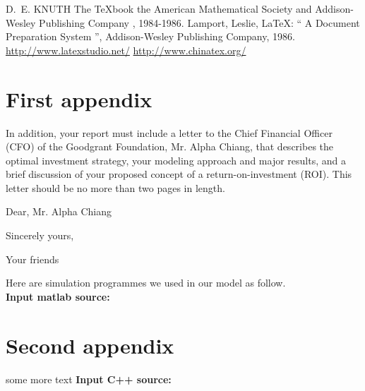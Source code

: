\documentclass{mcmthesis}
\begin{document}
\begin{thebibliography}{99}
   D.~E. KNUTH   The \TeX{}book  the American
  Mathematical Society and Addison-Wesley
  Publishing Company , 1984-1986.
  Lamport, Leslie,  \LaTeX{}: `` A Document Preparation System '',
  Addison-Wesley Publishing Company, 1986.
  \url{http://www.latexstudio.net/}
  \url{http://www.chinatex.org/}
\end{thebibliography}

\begin{appendices}

  \section{First appendix}

  In addition, your report must include a letter to the Chief Financial Officer (CFO) of the Goodgrant Foundation, Mr. Alpha Chiang, that describes the optimal investment strategy, your modeling approach and major results, and a brief discussion of your proposed concept of a return-on-investment (ROI). This letter should be no more than two pages in length.

  \begin{letter}{Dear, Mr. Alpha Chiang}

    \lipsum[1-2]

    \vspace{\parskip}

    Sincerely yours,

    Your friends

  \end{letter}
  Here are simulation programmes we used in our model as follow.\\

  \textbf{\textcolor[rgb]{0.98,0.00,0.00}{Input matlab source:}}
  

  \section{Second appendix}

  some more text \textcolor[rgb]{0.98,0.00,0.00}{\textbf{Input C++ source:}}
  

\end{appendices}
\end{document}
